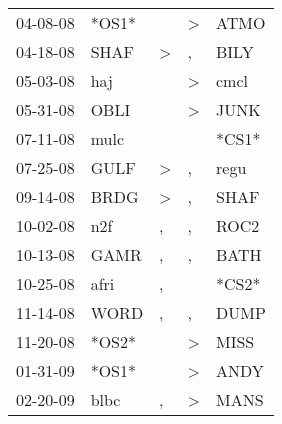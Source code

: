 \begin{supertabular}{p{0.07\textwidth}p{0.06\textwidth}p{0.02\textwidth}p{0.02\textwidth}p{0.06\textwidth}}
          04-08-08\textsuperscript{} &                            *OS1* &                  &     \textgreater &           ATMO\textsuperscript{} \\
          04-18-08\textsuperscript{} &           SHAF\textsuperscript{} &     \textgreater &                , &           BILY\textsuperscript{} \\
          05-03-08\textsuperscript{} &            haj\textsuperscript{} &                  &     \textgreater &           cmcl\textsuperscript{} \\
          05-31-08\textsuperscript{} &           OBLI\textsuperscript{} &                  &     \textgreater &           JUNK\textsuperscript{} \\
          07-11-08\textsuperscript{} &           mulc\textsuperscript{} &                  &                  &                            *CS1* \\
          07-25-08\textsuperscript{} &           GULF\textsuperscript{} &     \textgreater &                , &           regu\textsuperscript{} \\
          09-14-08\textsuperscript{} &           BRDG\textsuperscript{} &     \textgreater &                , &           SHAF\textsuperscript{} \\
          10-02-08\textsuperscript{} &            n2f\textsuperscript{} &                , &                , &           ROC2\textsuperscript{} \\
          10-13-08\textsuperscript{} &           GAMR\textsuperscript{} &                , &                , &           BATH\textsuperscript{} \\
          10-25-08\textsuperscript{} &           afri\textsuperscript{} &                , &                  &                            *CS2* \\
          11-14-08\textsuperscript{} &           WORD\textsuperscript{} &                , &                , &           DUMP\textsuperscript{} \\
          11-20-08\textsuperscript{} &                            *OS2* &                  &     \textgreater &           MISS\textsuperscript{} \\
          01-31-09\textsuperscript{} &                            *OS1* &                  &     \textgreater &           ANDY\textsuperscript{} \\
          02-20-09\textsuperscript{} &           blbc\textsuperscript{} &                , &     \textgreater &           MANS\textsuperscript{} \\

\end{supertabular}
